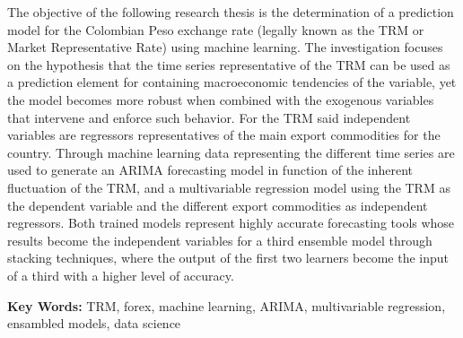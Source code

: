 \normalsize
The objective of the following research thesis is the determination of a prediction model for the Colombian Peso exchange rate (legally known as the TRM or Market Representative Rate) using machine learning. The investigation focuses on the hypothesis that the time series representative of the TRM can be used as a prediction element for containing macroeconomic tendencies of the variable, yet the model becomes more robust when combined with the exogenous variables that intervene and enforce such behavior. For the TRM said independent variables are regressors representatives of the main export commodities for the country. Through machine learning data representing the different time series are used to generate an ARIMA forecasting model in function of the inherent fluctuation of the TRM, and a multivariable regression model using the TRM as the dependent variable and the different export commodities as independent regressors. Both trained models represent highly accurate forecasting tools whose results become the independent variables for a third ensemble model through stacking techniques, where the output of the first two learners become the input of a third with a higher level of accuracy.

\textbf{Key Words:} TRM, forex, machine learning, ARIMA, multivariable regression, ensambled models, data science